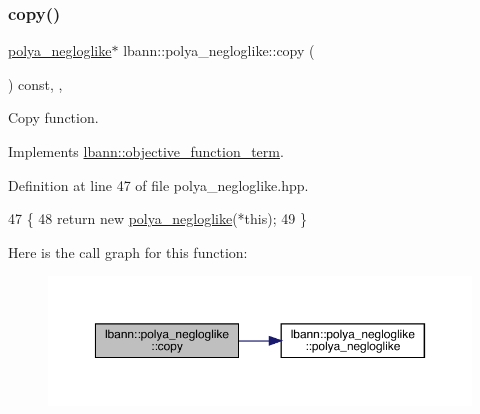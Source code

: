 \subsubsection{\texorpdfstring{copy()}{copy()}}
{\footnotesize\ttfamily \hyperlink{classlbann_1_1polya__negloglike}{polya\+\_\+negloglike}$\ast$ lbann\+::polya\+\_\+negloglike\+::copy (\begin{DoxyParamCaption}{ }\end{DoxyParamCaption}) const\hspace{0.3cm}{\ttfamily [inline]}, {\ttfamily [override]}, {\ttfamily [virtual]}}

Copy function. 

Implements \hyperlink{classlbann_1_1objective__function__term_ae98a4ec173a602ad55d1df20dadd4cb9}{lbann\+::objective\+\_\+function\+\_\+term}.



Definition at line 47 of file polya\+\_\+negloglike.\+hpp.


\begin{DoxyCode}
47                                           \{
48     \textcolor{keywordflow}{return} \textcolor{keyword}{new} \hyperlink{classlbann_1_1polya__negloglike_a3f3c7f775d548ac8e011fb1b637804cb}{polya\_negloglike}(*\textcolor{keyword}{this});
49   \}
\end{DoxyCode}
Here is the call graph for this function\+:\nopagebreak
\begin{figure}[H]
\begin{center}
\leavevmode
\includegraphics[width=350pt]{classlbann_1_1polya__negloglike_a526b3229a4143359c041f8d88b0a729b_cgraph}
\end{center}
\end{figure}
\mbox{\label{classlbann_1_1polya__negloglike_a95fea60663d86cab31d89531046cc32c}} 
